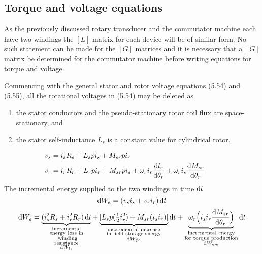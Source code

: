 \documentclass[a4paper,numbers=noenddot,12pt]{scrbook}
\begin{document}
\subsection{Torque and voltage equations}
As the previously discussed rotary transducer and the commutator machine each have two windings the $[L]$ matrix for each device will be of similar form. No such statement can be made for the $[G]$ matrices and it is necessary that a $[G]$ matrix be determined for the commutator machine before writing equations for torque and voltage.

Commencing with the general stator and rotor voltage equations (5.54) and (5.55), all the rotational voltages in (5.54) may be deleted as
\noindent
\begin{enumerate}
    \item the stator conductors and the pseudo-stationary rotor coil flux are space-stationary, and
    \item the stator self-inductance $L_s$ is a constant value for cylindrical rotor.
\end{enumerate} 
\begin{align}
    v_s & = i_s R_s + L_s p i_s + M_{sr} p i_r \\
    v_r & = i_r R_r + L_r p i_r + M_{sr} p i_s + \omega_r i_r \frac{\dif l_r}{\dif \theta_r} + \omega_r i _s \frac{\dif M_{sr}}{\dif \theta_r} &&
\end{align}
The incremental energy supplied to the two windings in time $\dif t$
\begin{equation}
    \dif W_e = (v_s i_s + v_r i_r) \dif t
\end{equation}
\begin{equation}
    \dif W_e = \underbrace{(i_s^2 R_s + i_r^2 R_r)\dif t}_
    {\substack{\text{incremental}\\ 
    \text{energy loss in}\\ 
    \text{winding} \\
    \text{resistance} \\ 
    \dif W_{le}}} + 
    \underbrace{[L_s p (\tfrac{1}{2}i_r^2) + M_{sr}(i_s i_r)]}_
    {\substack{\text{inceremental increase}\\
    \text{in field storage snergy}\\
    \dif W_{fe}}}
    \dif t
    + \underbrace{\omega_r \Big( i_s i_r \frac{\dif M_{sr}}{\dif \theta_r} \Big)}_
    {\substack{\text{incremental energy} \\
    \text{for torque production} \\
    \dif W_{em}}}
    \dif t		
\end{equation}
\end{document}
